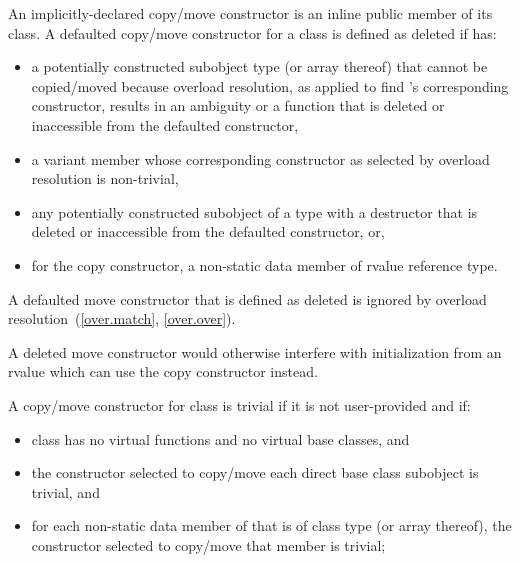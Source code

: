 \pnum
An implicitly-declared copy/move constructor is an
inline public member of its class.
A defaulted copy/\brk{}move constructor for a class
   is defined as deleted if  has:
\begin{itemize}
\item a potentially constructed subobject type
   (or array thereof) that cannot be copied/moved because
  overload resolution, as applied to find
  's
  corresponding constructor, results in an ambiguity or
  a function that is deleted or inaccessible from the
  defaulted constructor,

\item a variant member whose corresponding constructor
  as selected by overload resolution is non-trivial,

\item any potentially constructed subobject of a type
  with a destructor that is deleted or inaccessible from the defaulted
  constructor, or,

\item for the copy constructor, a non-static data member of rvalue reference type.
\end{itemize}

A defaulted move constructor that is defined as deleted is ignored by overload
resolution~(\ref{over.match}, \ref{over.over}).
\begin{note}
A deleted move constructor would otherwise interfere with initialization from
an rvalue which can use the copy constructor instead.
\end{note}

\pnum
{}%
%
A copy/move constructor for class
is
trivial
if it is not user-provided and if:

\begin{itemize}
\item
class
has no virtual functions
and no virtual base classes, and

\item
the constructor selected to copy/move each direct base class subobject is trivial, and

\item
for each non-static data member of
that is of class type (or array thereof),
the constructor selected to copy/move that member is trivial;
\end{itemize}

